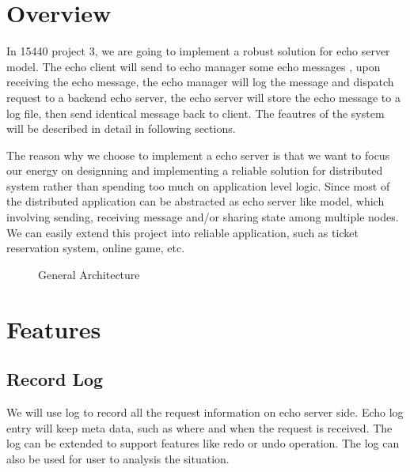 \documentclass[12pt]{article}
\begin{document}
\pagestyle{headings}
\setcounter{page}{1}

\section{Overview}
In 15440 project 3, we are going to implement a robust solution for
echo server model. The echo client will send to echo manager some echo messages
, upon receiving the echo message, the echo manager will log the message and 
dispatch request to a backend echo server, the echo server will store the echo 
message to a log file, then send identical message back to client. The feautres of the 
system will be described in detail in following sections. 

The reason why we choose to implement a echo server is that
we want to focus our energy on designning and implementing a reliable solution
for distributed system rather than spending too much on application level logic. 
Since most of the distributed
application can be abstracted as echo server like model, which involving
sending, receiving message and/or sharing state among multiple nodes. We 
can easily extend this project into reliable application, such as 
ticket reservation system, online game, etc.

\begin{figure}[H] %
\caption{General Architecture}
\label{fig:speciation}
\end{figure}

\section{Features}
\subsection{Record Log}
We will use log to record all the request information on echo server side. Echo log
entry will keep meta data, such as where and when the request is received. The log can
be extended to support features like redo or undo operation. The log can also be used
for user to analysis the situation.
\end{document}
